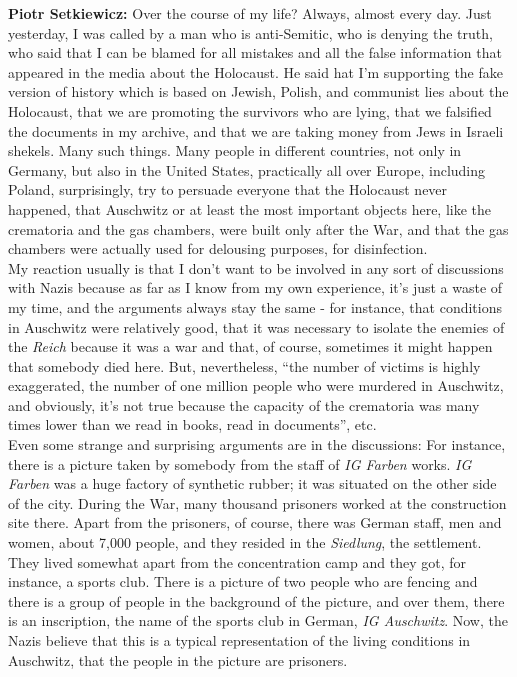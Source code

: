 \textbf{Piotr Setkiewicz:} Over the course of my life? Always, almost every day. Just yesterday, I was called by a man who is anti-Semitic, who is denying the truth, who said that I can be blamed for all mistakes and all the false information that appeared in the media about the Holocaust. He said hat I'm supporting the fake version of history which is based on Jewish, Polish, and communist lies about the Holocaust, that we are promoting the survivors who are lying, that we falsified the documents in my archive, and that we are taking money from Jews in Israeli shekels. Many such things. Many people in different countries, not only in Germany, but also in the United States, practically all over Europe, including Poland, surprisingly, try to persuade everyone that the Holocaust never happened, that Auschwitz or at least the most important objects here, like the crematoria and the gas chambers, were built only after the War, and that the gas chambers were actually used for delousing purposes, for disinfection.\\ 
My reaction usually is that I don't want to be involved in any sort of discussions with Nazis because as far as I know from my own experience, it's just a waste of my time, and the arguments always stay the same - for instance, that conditions in Auschwitz were relatively good, that it was necessary to isolate the enemies of the \textit{Reich} because it was a war and that, of course, sometimes it might happen that somebody died here. But, nevertheless, ``the number of victims is highly exaggerated, the number of one million people who were murdered in Auschwitz, and obviously, it's not true because the capacity of the crematoria was many times lower than we read in books, read in documents'', etc.\\ 
Even some strange and surprising arguments are in the discussions: For instance, there is a picture taken by somebody from the staff of \textit{IG Farben} works. \textit{IG Farben} was a huge factory of synthetic rubber; it was situated on the other side of the city. During the War, many thousand prisoners worked at the construction site there. Apart from the prisoners, of course, there was German staff, men and women, about 7,000 people, and they resided in the \textit{Siedlung}, the settlement. They lived somewhat apart from the concentration camp and they got, for instance, a sports club. There is a picture of two people who are fencing and there is a group of people in the background of the picture, and over them, there is an inscription, the name of the sports club in German, \textit{IG Auschwitz}. Now, the Nazis believe that this is a typical representation of the living conditions in Auschwitz, that the people in the picture are prisoners.\\ 
